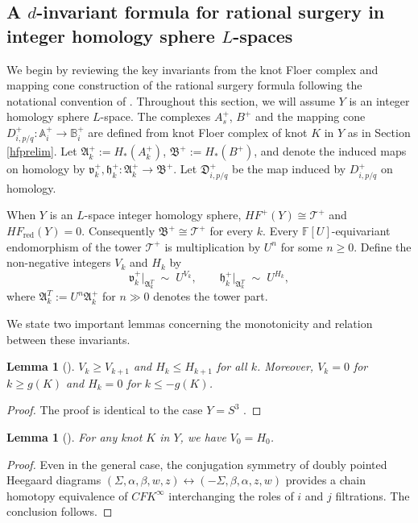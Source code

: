 \documentclass[12pt]{amsart}
\newtheorem{lemma}[theorem]{Lemma}
\theoremstyle{definition}
\theoremstyle{definition}
\newcommand{\F}{{\mathbb{F}}}
\newcommand{\CFKINFTY}{{CFK}^{\infty}}
\newcommand{\HF}{HF}
\begin{document}
\subsection*{ A $d$-invariant formula for rational surgery in integer homology sphere $L$-spaces  }
We begin by reviewing the key invariants from the knot Floer complex and mapping cone construction of the rational surgery formula following the notational convention of \cite{NiWu,Wu}. Throughout this section, we will assume $Y$ is an integer homology sphere $L$-space. The complexes $A_s^+$, $B^+$ and the mapping cone  $D^+_{i,p/q} \colon \mathbb{A}_i^+ \to \mathbb{B}_i^+$ are defined from knot Floer complex of knot $K$ in $Y$ as in Section \ref{hfprelim}. Let $\mathfrak{A}_k^+ := H_*(A_k^+)$,
$\mathfrak{B}^+ := H_*(B^+)$, and denote the induced maps on homology
by $\mathfrak{v}_k^+, \mathfrak{h}_k^+ \colon \mathfrak{A}_k^+ \to
\mathfrak{B}^+$. Let $\mathfrak{D}^+_{i,p/q}$ be the map induced by $D^+_{i,p/q}$ on homology.

\medskip
When $Y$ is an $L$-space integer homology sphere, $\HF^+(Y) \cong \mathcal{T}^+$ and $\HF_{\mathrm{red}}(Y) = 0$.  Consequently
$\mathfrak{B}^+ \cong \mathcal{T}^+$  for every $k$.
Every $\F[U]$-equivariant endomorphism of the tower $\mathcal{T}^+$ is multiplication by $U^n$ for some $n \geq 0$.  Define the non-negative integers $V_k$ and $H_k$ by
\begin{equation}\label{eq:VkHkdef}
\mathfrak{v}_k^+\big|_{\mathfrak{A}_k^T} \;\sim\; U^{V_k}, \qquad
\mathfrak{h}_k^+\big|_{\mathfrak{A}_k^T} \;\sim\; U^{H_k},
\end{equation}
where $\mathfrak{A}_k^T := U^n \mathfrak{A}_k^+$ for $n \gg 0$
denotes the tower part.  

We state two important lemmas concerning the monotonicity and relation between these invariants.
\begin{lemma}[{\cite[Lemma~2.4]{NiWu}}]\label{lem:monotone}
$V_k \geq V_{k+1}$ and $H_k \leq H_{k+1}$ for all $k$.
Moreover, $V_k = 0$ for $k \geq g(K)$ and $H_k = 0$ for $k \leq -g(K)$.
\end{lemma}
\begin{proof}
    The proof is identical to the case $Y = S^3$ {\cite[Lemma~2.4]{NiWu}}.
\end{proof}

\begin{lemma}[{\cite[Lemma~2.7]{NiWu}}]\label{lem:V0H0}
For any knot $K$ in $Y$, we have $V_0=H_0$.
\end{lemma}
\begin{proof}
    Even in the general case, the conjugation symmetry of doubly pointed Heegaard diagrams $(\Sigma,\alpha,\beta,w,z) \leftrightarrow (-\Sigma,\beta,\alpha, z,w)$ provides a chain homotopy equivalence of $\CFKINFTY$ interchanging the roles of $i$ and $j$ filtrations. The conclusion follows.
\end{proof}
\end{document}
